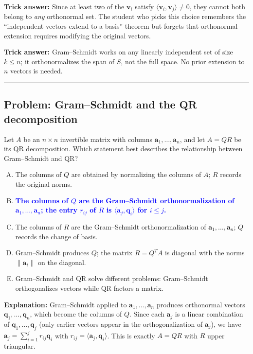 \documentclass[12pt]{amsart}
\newcommand{\divider}{
  \vspace{-1em}
  \noindent
  \raisebox{-0.15ex}{\textbullet}%
  \hspace{0.5em}%
  \rule[0.5ex]{0.95\textwidth}{1.0pt}%
  \hspace{0.5em}%
  \raisebox{-0.15ex}{\textbullet}%
  \vspace{0em}
}
\begin{document}
\textbf{Trick answer:}
Since at least two of the $\mathbf{v}_i$ satisfy $\langle\mathbf{v}_i,\mathbf{v}_j\rangle\neq 0$,
they cannot both belong to \emph{any} orthonormal set.
The student who picks this choice remembers the ``independent vectors extend
to a basis'' theorem but forgets that orthonormal extension requires modifying
the original vectors.

\textbf{Trick answer:}
Gram--Schmidt works on any linearly independent set of size $k \leq n$;
it orthonormalizes the span of $S$, not the full space.
No prior extension to $n$ vectors is needed.

\divider

\subsection*{Problem: Gram--Schmidt and the QR decomposition}

Let $A$ be an $n\times n$ invertible matrix with columns
$\mathbf{a}_1,\ldots,\mathbf{a}_n$, and let $A = QR$ be its QR decomposition.
Which statement best describes the relationship between Gram--Schmidt and QR?

\begin{enumerate}[(A)]
\item The columns of $Q$ are obtained by normalizing the columns of $A$; $R$ records the original norms.
\item \textcolor{blue}{\textbf{The columns of $Q$ are the Gram--Schmidt orthonormalization of $\mathbf{a}_1, \ldots, \mathbf{a}_n$; the entry $r_{ij}$ of $R$ is $\langle \mathbf{a}_j, \mathbf{q}_i \rangle$ for $i \leq j$.}}
\item The columns of $R$ are the Gram--Schmidt orthonormalization of $\mathbf{a}_1, \ldots, \mathbf{a}_n$; $Q$ records the change of basis.
\item Gram--Schmidt produces $Q$; the matrix $R = Q^T A$ is diagonal with the norms $\|\mathbf{a}_i\|$ on the diagonal.
\item Gram--Schmidt and QR solve different problems: Gram--Schmidt orthogonalizes vectors while QR factors a matrix.
\end{enumerate}

\textbf{Explanation:}
Gram--Schmidt applied to $\mathbf{a}_1,\ldots,\mathbf{a}_n$ produces orthonormal vectors
$\mathbf{q}_1,\ldots,\mathbf{q}_n$, which become the columns of $Q$.
Since each $\mathbf{a}_j$ is a linear combination of $\mathbf{q}_1,\ldots,\mathbf{q}_j$
(only earlier vectors appear in the orthogonalization of $\mathbf{a}_j$), we have
$\mathbf{a}_j = \sum_{i=1}^{j} r_{ij}\mathbf{q}_i$ with $r_{ij} = \langle\mathbf{a}_j,\mathbf{q}_i\rangle$.
This is exactly $A = QR$ with $R$ upper triangular.
\end{document}

